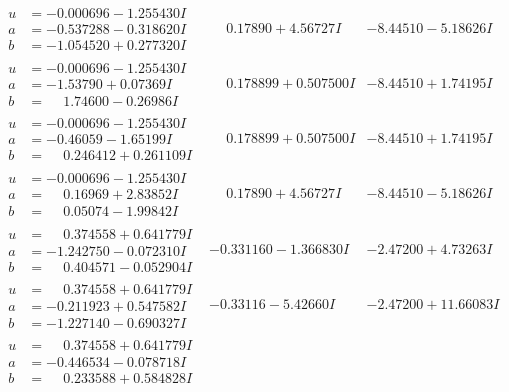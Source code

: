 \documentclass[1p]{elsarticle_modified}
\theoremstyle{definition}
\begin{document}
$$\begin{array}{c|c|c}
\begin{aligned}
u &= -0.000696 - 1.255430 I \\
a &= -0.537288 - 0.318620 I \\
b &= -1.054520 + 0.277320 I\end{aligned}
 & \phantom{-}0.17890 + 4.56727 I & -8.44510 - 5.18626 I \\ \hline\begin{aligned}
u &= -0.000696 - 1.255430 I \\
a &= -1.53790 + 0.07369 I \\
b &= \phantom{-}1.74600 - 0.26986 I\end{aligned}
 & \phantom{-}0.178899 + 0.507500 I & -8.44510 + 1.74195 I \\ \hline\begin{aligned}
u &= -0.000696 - 1.255430 I \\
a &= -0.46059 - 1.65199 I \\
b &= \phantom{-}0.246412 + 0.261109 I\end{aligned}
 & \phantom{-}0.178899 + 0.507500 I & -8.44510 + 1.74195 I \\ \hline\begin{aligned}
u &= -0.000696 - 1.255430 I \\
a &= \phantom{-}0.16969 + 2.83852 I \\
b &= \phantom{-}0.05074 - 1.99842 I\end{aligned}
 & \phantom{-}0.17890 + 4.56727 I & -8.44510 - 5.18626 I \\ \hline\begin{aligned}
u &= \phantom{-}0.374558 + 0.641779 I \\
a &= -1.242750 - 0.072310 I \\
b &= \phantom{-}0.404571 - 0.052904 I\end{aligned}
 & -0.331160 - 1.366830 I & -2.47200 + 4.73263 I \\ \hline\begin{aligned}
u &= \phantom{-}0.374558 + 0.641779 I \\
a &= -0.211923 + 0.547582 I \\
b &= -1.227140 - 0.690327 I\end{aligned}
 & -0.33116 - 5.42660 I & -2.47200 + 11.66083 I \\ \hline\begin{aligned}
u &= \phantom{-}0.374558 + 0.641779 I \\
a &= -0.446534 - 0.078718 I \\
b &= \phantom{-}0.233588 + 0.584828 I\end{aligned}

\end{array}$$
\end{document}
